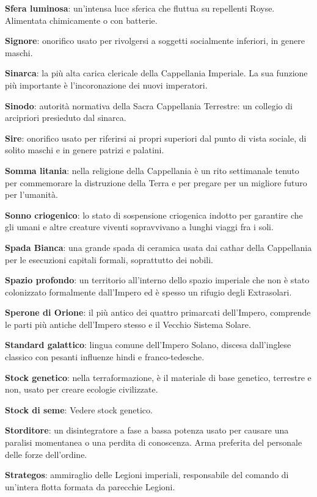 \textbf{Sfera luminosa}: un'intensa luce sferica che fluttua su
repellenti Royse. Alimentata chimicamente o con batterie.

\textbf{Signore}: onorifico usato per rivolgersi a soggetti socialmente
inferiori, in genere maschi.

\textbf{Sinarca}: la più alta carica clericale della Cappellania
Imperiale. La sua funzione più importante è l'incoronazione dei nuovi
imperatori.

\textbf{Sinodo}: autorità normativa della Sacra Cappellania Terrestre:
un collegio di arcipriori presieduto dal sinarca.

\textbf{Sire}: onorifico usato per riferirsi ai propri superiori dal
punto di vista sociale, di solito maschi e in genere patrizi e palatini.

\textbf{Somma litania}: nella religione della Cappellania è un rito
settimanale tenuto per commemorare la distruzione della Terra e per
pregare per un migliore futuro per l'umanità.

\textbf{Sonno criogenico}: lo stato di sospensione criogenica indotto
per garantire che gli umani e altre creature viventi sopravvivano a
lunghi viaggi fra i soli.

\textbf{Spada Bianca}: una grande spada di ceramica usata dai cathar
della Cappellania per le esecuzioni capitali formali, soprattutto dei
nobili.

\textbf{Spazio profondo}: un territorio all'interno dello spazio
imperiale che non è stato colonizzato formalmente dall'Impero ed è
spesso un rifugio degli Extrasolari.

\textbf{Sperone di Orione}: il più antico dei quattro primarcati
dell'Impero, comprende le parti più antiche dell'Impero stesso e il
Vecchio Sistema Solare.

\textbf{Standard galattico}: lingua comune dell'Impero Solano, discesa
dall'inglese classico con pesanti influenze hindi e franco-tedesche.

\textbf{Stock genetico}: nella terraformazione, è il materiale di base
genetico, terrestre e non, usato per creare ecologie civilizzate.

\textbf{Stock di seme}: Vedere stock genetico.

\textbf{Storditore}: un disintegratore a fase a bassa potenza usato per
causare una paralisi momentanea o una perdita di conoscenza. Arma
preferita del personale delle forze dell'ordine.

\textbf{Strategos}: ammiraglio delle Legioni imperiali, responsabile del
comando di un'intera flotta formata da parecchie Legioni.


